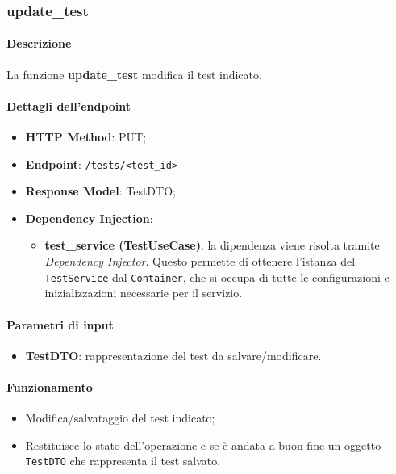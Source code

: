 \subsubsection{update\_test}
\label{subsubsec:update_test}

\paragraph{Descrizione}
La funzione \textbf{update\_test} modifica il test indicato.

\paragraph{Dettagli dell'endpoint}
\begin{itemize}
    \item \textbf{HTTP Method}: PUT;
    \item \textbf{Endpoint}: \texttt{/tests/<test\_id>}
    \item \textbf{Response Model}: TestDTO;
    \item \textbf{Dependency Injection}: 
    \begin{itemize}
        \item \textbf{test\_service (TestUseCase)}: la dipendenza viene risolta tramite \textit{Dependency Injector}. Questo permette di ottenere l'istanza del \texttt{TestService} dal \texttt{Container}, che si occupa di tutte le configurazioni e inizializzazioni necessarie per il servizio.
    \end{itemize}

\end{itemize}

\paragraph{Parametri di input}
\begin{itemize}
    \item \textbf{TestDTO}: rappresentazione del test da salvare/modificare.
\end{itemize}

\paragraph{Funzionamento}
\begin{itemize}
    \item Modifica/salvataggio del test indicato;
    \item Restituisce lo stato dell'operazione e se è andata a buon fine un oggetto \texttt{TestDTO} che rappresenta il test salvato. 
\end{itemize}

